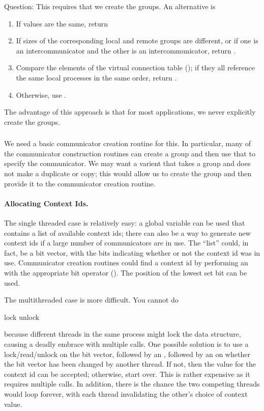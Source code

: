 \documentclass{article}
\begin{document}
Question:  This requires that we create the groups.  An alternative is
\begin{enumerate}
\item If  values are the same, return
\item If sizes of the corresponding local and remote groups are
  different, or if one is an intercommunicator and the other is an
  intercommunicator, return .
\item Compare the elements of the virtual connection table
  (); if they all reference the same local
  processes in the same order, return .
\item Otherwise, use .
\end{enumerate}
The advantage of this approach is that for most applications, we never
explicitly create the groups.


\subsubsection{}
We need a basic communicator creation routine for this.  In
particular, many of the communicator construction routines can create
a group and then use that to specify the communicator.  We may want a
varient that takes a group and does not make a duplicate or copy; this
would allow us to create the group and then provide it to the
communicator creation routine.

\paragraph{Allocating Context Ids.}
The single threaded case is relatively easy: a global variable can be used
that contains a list of available context ids; there can also be a way to
generate new context ids if a large number of communicators are in use.  The
``list'' could, in fact, be a bit vector, with the bits indicating whether or
not the context id was in use.  Communicator creation routines could find a
context id by performing an  with the appropriate bit
operator ().  The position of the lowest set bit can be
used.  

The multithreaded case is more difficult.  You cannot do
\begin{algorithm}
  lock
  unlock
\end{algorithm}
\noindent
because different threads in the same process might lock the data structure,
causing a deadly embrace with multiple  calls.
One possible solution is to use a lock/read/unlock on the bit vector, followed
by an , followed by an  on
whether the bit vector has been changed by another thread.  If not, then the
value for the context id can be accepted; otherwise, start over.  
This is rather expensive as it requires multiple
 calls.  In addition, there is the chance the
two competing threads would loop forever, with each thread
invalidating the other's choice of context value.
\end{document}
